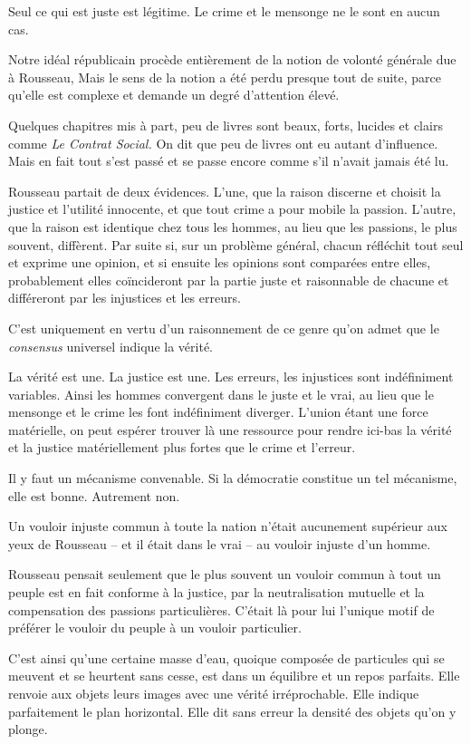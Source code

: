 \documentclass[french,twoside]{book} %
\begin{document}
Seul ce qui est juste est légitime. Le crime et le mensonge ne le sont en aucun cas.\par
Notre idéal républicain procède entièrement de la notion de volonté générale due à Rousseau, Mais le sens de la notion a été perdu presque tout de suite, parce qu’elle est complexe et demande un degré d’attention élevé.\par
Quelques chapitres mis à part, peu de livres sont beaux, forts, lucides et clairs comme \emph{Le Contrat Social.} On dit que peu de livres ont eu autant d’influence. Mais en fait tout s’est passé et se passe encore comme s’il n’avait jamais été lu.\par
Rousseau partait de deux évidences. L’une, que la raison discerne et choisit la justice et l’utilité innocente, et que tout crime a pour mobile la passion. L’autre, que la raison est identique chez tous les hommes, au lieu que les passions, le plus souvent, diffèrent. Par suite si, sur un problème général, chacun réfléchit tout seul et exprime une opinion, et si ensuite les opinions sont comparées entre elles, probablement elles coïncideront par la partie juste et raisonnable de chacune et différeront par les injustices et les erreurs.\par
C’est uniquement en vertu d’un raisonnement de ce genre qu’on admet que le \emph{consensus} universel indique la vérité.\par
La vérité est une. La justice est une. Les erreurs, les injustices sont indéfiniment variables. Ainsi les hommes convergent dans le juste et le vrai, au lieu que le mensonge et le crime les font indéfiniment diverger. L’union étant une force matérielle, on peut espérer trouver là une ressource pour rendre ici-bas la vérité et la justice matériellement plus fortes que le crime et l’erreur.\par
Il y faut un mécanisme convenable. Si la démocratie constitue un tel mécanisme, elle est bonne. Autrement non.\par
Un vouloir injuste commun à toute la nation n’était aucunement supérieur aux yeux de Rousseau – et il était dans le vrai – au vouloir injuste d’un homme.\par
Rousseau pensait seulement que le plus souvent un vouloir commun à tout un peuple est en fait conforme à la justice, par la neutralisation mutuelle et la compensation des passions particulières. C’était là pour lui l’unique motif de préférer le vouloir du peuple à un vouloir particulier.\par
C’est ainsi qu’une certaine masse d’eau, quoique composée de particules qui se meuvent et se heurtent sans cesse, est dans un équilibre et un repos parfaits. Elle renvoie aux objets leurs images avec une vérité irréprochable. Elle indique parfaitement le plan horizontal. Elle dit sans erreur la densité des objets qu’on y plonge.\par
\end{document}

